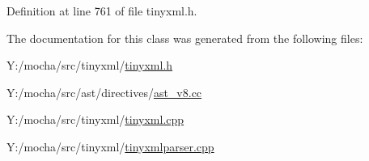 Definition at line 761 of file tinyxml.h.



The documentation for this class was generated from the following files:\begin{DoxyCompactItemize}
\item 
Y:/mocha/src/tinyxml/\hyperlink{tinyxml_8h}{tinyxml.h}\item 
Y:/mocha/src/ast/directives/\hyperlink{ast__v8_8cc}{ast\_\-v8.cc}\item 
Y:/mocha/src/tinyxml/\hyperlink{tinyxml_8cpp}{tinyxml.cpp}\item 
Y:/mocha/src/tinyxml/\hyperlink{tinyxmlparser_8cpp}{tinyxmlparser.cpp}\end{DoxyCompactItemize}
